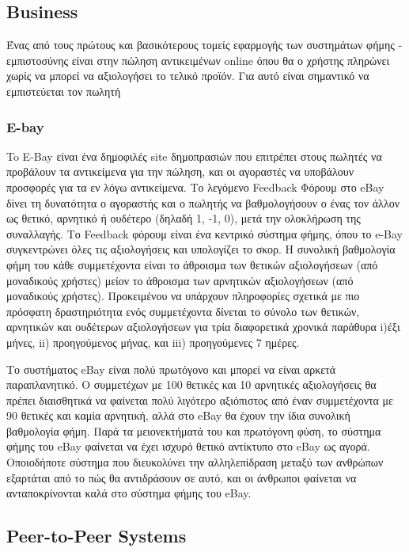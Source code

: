 \subsection{Business}

Ένας από τους πρώτους και βασικότερους τομείς εφαρμογής των συστημάτων φήμης - εμπιστοσύνης είναι στην πώληση αντικειμένων online όπου θα ο χρήστης πληρώνει χωρίς να μπορεί να αξιολογήσει το τελικό προϊόν. Για αυτό είναι σημαντικό να εμπιστεύεται τον πωλητή

\subsubsection{E-bay}
To E-Bay \cite{e-bay}
 είναι ένα δημοφιλές site δημοπρασιών που επιτρέπει στους πωλητές να προβάλουν τα αντικείμενα για την πώληση, και οι αγοραστές να υποβάλουν προσφορές για τα εν λόγω αντικείμενα. Το λεγόμενο Feedback Φόρουμ στο eBay δίνει τη δυνατότητα ο αγοραστής και ο πωλητής  να βαθμολογήσουν ο ένας τον άλλον ως θετικό, αρνητικό ή ουδέτερο (δηλαδή 1, -1, 0), μετά την ολοκλήρωση της συναλλαγής. Το Feedback φόρουμ είναι ένα κεντρικό σύστημα φήμης, όπου το e-Bay συγκεντρώνει όλες τις αξιολογήσεις και υπολογίζει το σκορ. Η συνολική βαθμολογία φήμη του κάθε συμμετέχοντα είναι το άθροισμα των θετικών αξιολογήσεων (από μοναδικούς χρήστες) μείον το άθροισμα των αρνητικών αξιολογήσεων (από μοναδικούς χρήστες). Προκειμένου να υπάρχουν πληροφορίες σχετικά με πιο πρόσφατη δραστηριότητα ενός συμμετέχοντα δίνεται το σύνολο των θετικών, αρνητικών και ουδέτερων αξιολογήσεων για τρία διαφορετικά χρονικά παράθυρα i)έξι μήνες, ii) προηγούμενος μήνας, και iii) προηγούμενες 7 ημέρες.

Το συστήματος eBay είναι πολύ πρωτόγονο και μπορεί να είναι αρκετά παραπλανητικό. Ο συμμετέχων με 100 θετικές και 10 αρνητικές αξιολογήσεις θα πρέπει διαισθητικά να φαίνεται πολύ λιγότερο αξιόπιστος από έναν συμμετέχοντα με 90 θετικές και καμία αρνητική, αλλά στο eBay θα έχουν την ίδια συνολική βαθμολογία φήμη. Παρά τα μειονεκτήματά του και πρωτόγονη φύση, το σύστημα φήμης του eBay  φαίνεται να έχει ισχυρό θετικό αντίκτυπο στο eBay ως αγορά. Οποιοδήποτε σύστημα που διευκολύνει την αλληλεπίδραση μεταξύ των ανθρώπων εξαρτάται από το πώς θα αντιδράσουν σε αυτό, και οι άνθρωποι φαίνεται να ανταποκρίνονται καλά στο σύστημα φήμης του eBay.

\subsection{Peer-to-Peer Systems}

